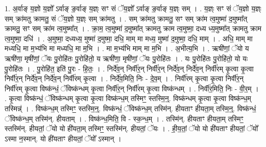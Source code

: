 \documentclass[17pt]{extarticle}
\begin{document}
1. अ॒र्वाङ् य॒ज्ञो य॒ज्ञो᳚ ऽर्वाङ् ङ॒र्वाङ् य॒ज्ञ्ः सꣳ सं ॅय॒ज्ञो᳚ ऽर्वाङ् ङ॒र्वाङ् य॒ज्ञ्ः सम् । . य॒ज्ञ्ः सꣳ सं ॅय॒ज्ञो य॒ज्ञ्ः सम् क्रा॑मतु क्रामतु॒ सं ॅय॒ज्ञो य॒ज्ञ्ः सम् क्रा॑मतु । . सम् क्रा॑मतु क्रामतु॒ सꣳ सम् क्रा॑म त्व॒मुष्मा॑ द॒मुष्मा᳚त् क्रामतु॒ सꣳ सम् क्रा॑म त्व॒मुष्मा᳚त् । . क्रा॒म॒ त्व॒मुष्मा॑ द॒मुष्मा᳚त् क्रामतु क्राम त्व॒मुष्मा॒ दध्य ध्य॒मुष्मा᳚त् क्रामतु क्राम त्व॒मुष्मा॒ दधि॑ । . अ॒मुष्मा॒ दध्यध्य॒ मुष्मा॑ द॒मुष्मा॒ दधि॒ माम् मा मध्य॒ मुष्मा॑ द॒मुष्मा॒ दधि॒ माम् । . अधि॒ माम् मा मध्यधि॒ मा म॒भ्य॑भि मा मध्यधि॒ मा म॒भि । . मा म॒भ्य॑भि माम् मा म॒भि । . अ॒भीत्य॒भि । . ऋषी॑णां॒ ॅयो य ऋषी॑णा॒ मृषी॑णां॒ ॅयः पु॒रोहि॑तः पु॒रोहि॑तो॒ य ऋषी॑णा॒ मृषी॑णां॒ ॅयः पु॒रोहि॑तः । . यः पु॒रोहि॑तः पु॒रोहि॑तो॒ यो यः पु॒रोहि॑तः । . पु॒रोहि॑त॒ इति॑ पु॒रः - हि॒तः॒ । . निर्दे॑व॒न् निर्वी॑र॒न् निर्वी॑र॒न् निर्दे॑व॒न् निर्दे॑व॒न् निर्वी॑रम् कृ॒त्वा कृ॒त्वा निर्वी॑र॒न् निर्दे॑व॒न् निर्दे॑व॒न् निर्वी॑रम् कृ॒त्वा । . निर्दे॑व॒मिति॒ निः - दे॒व॒म् । . निर्वी॑रम् कृ॒त्वा कृ॒त्वा निर्वी॑र॒न् निर्वी॑रम् कृ॒त्वा विष्क॑न्धं॒ ॅविष्क॑न्धम् कृ॒त्वा निर्वी॑र॒न् निर्वी॑रम् कृ॒त्वा विष्क॑न्धम् । . निर्वी॑र॒मिति॒ निः - वी॒र॒म् । . कृ॒त्वा विष्क॑न्धं॒ ॅविष्क॑न्धम् कृ॒त्वा कृ॒त्वा विष्क॑न्ध॒म् तस्मिꣳ॒॒ स्तस्मि॒न्॒. विष्क॑न्धम् कृ॒त्वा कृ॒त्वा विष्क॑न्ध॒म् तस्मिन्न्॑ । . विष्क॑न्ध॒म् तस्मिꣳ॒॒ स्तस्मि॒न्॒. विष्क॑न्धं॒ ॅविष्क॑न्ध॒म् तस्मि॑न्. हीयताꣳ हीयता॒म् तस्मि॒न्॒. विष्क॑न्धं॒ ॅविष्क॑न्ध॒म् तस्मि॑न्. हीयताम् । . विष्क॑न्ध॒मिति॒ वि - स्क॒न्ध॒म् । . तस्मि॑न्. हीयताꣳ हीयता॒म् तस्मिꣳ॒॒ स्तस्मि॑न्. हीयतां॒ ॅयो यो ही॑यता॒म् तस्मिꣳ॒॒ स्तस्मि॑न्. हीयतां॒ ॅयः । . ही॒य॒तां॒ ॅयो यो ही॑यताꣳ हीयतां॒ ॅयो᳚ ऽस्मा न॒स्मान्. यो ही॑यताꣳ हीयतां॒ ॅयो᳚ ऽस्मान् । \newline
\end{document}
